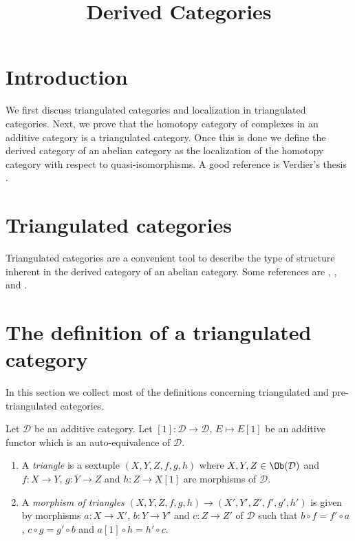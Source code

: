 

%


\title{Derived Categories}


\maketitle

\label{section-phantom}

\tableofcontents

\section{Introduction}
\label{section-introduction}

\noindent
We first discuss triangulated categories and localization in triangulated
categories. Next, we prove that the homotopy category of complexes in an
additive category is a triangulated category. Once this is done we define
the derived category of an abelian category as the localization of the
homotopy category with respect to quasi-isomorphisms.
A good reference is Verdier's thesis \cite{Verdier}.



\section{Triangulated categories}
\label{section-triangulated-categories}

\noindent
Triangulated categories are a convenient tool to describe the type
of structure inherent in the derived category of an abelian category.
Some references are \cite{Verdier}, \cite{KS}, and \cite{Neeman}.




\section{The definition of a triangulated category}
\label{section-triangulated-definitions}

\noindent
In this section we collect most of the definitions concerning triangulated
and pre-triangulated categories.

\begin{definition}
\label{definition-triangle}
Let $\mathcal{D}$ be an additive category. Let
$[1] : \mathcal{D} \to \mathcal{D}$, $E \mapsto E[1]$
be an additive functor which is an auto-equivalence of $\mathcal{D}$.
\begin{enumerate}
\item A {\it triangle} is a sextuple
$(X, Y, Z, f, g, h)$ where $X, Y, Z \in \Ob(\mathcal{D})$ and
$f : X \to Y$, $g : Y \to Z$ and $h : Z \to X[1]$ are morphisms
of $\mathcal{D}$.
\item A {\it morphism of triangles}
$(X, Y, Z, f, g, h) \to (X', Y', Z', f', g', h')$
is given by morphisms $a : X \to X'$, $b : Y \to Y'$ and $c : Z \to Z'$
of $\mathcal{D}$ such that
$b \circ f = f' \circ a$, $c  \circ g = g' \circ b$ and
$a[1] \circ h = h' \circ c$.
\end{enumerate}
\end{definition}

